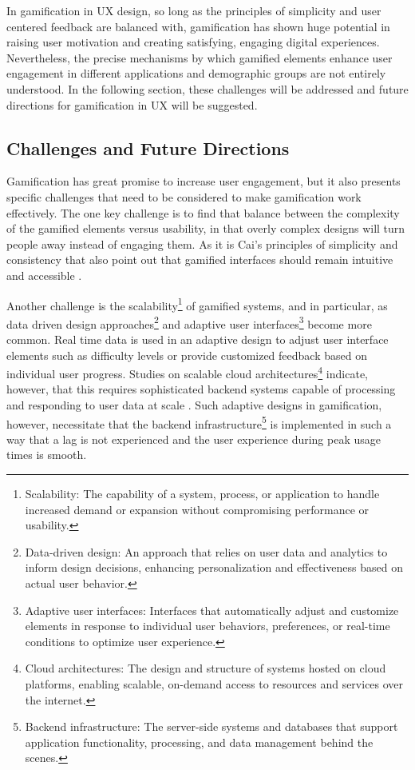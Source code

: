 \documentclass[conference]{IEEEtran}
\begin{document}
In gamification in UX design, so long as the principles of simplicity and user centered feedback are balanced with, gamification has shown huge potential in raising user motivation and creating satisfying, engaging digital experiences. Nevertheless, the precise mechanisms by which gamified elements enhance user engagement in different applications and demographic groups are not entirely understood. In the following section, these challenges will be addressed and future directions for gamification in UX will be suggested.

\subsection{Challenges and Future Directions}

Gamification has great promise to increase user engagement, but it also presents specific challenges that need to be considered to make gamification work effectively. The one key challenge is to find that balance between the complexity of the gamified elements versus usability, in that overly complex designs will turn people away instead of engaging them. As it is Cai’s principles of simplicity and consistency that also point out that gamified interfaces should remain intuitive and accessible \cite{cai2009}.

Another challenge is the scalability\footnote{Scalability: The capability of a system, process, or application to handle increased demand or expansion without compromising performance or usability.} of gamified systems, and in particular, as data driven design approaches\footnote{Data-driven design: An approach that relies on user data and analytics to inform design decisions, enhancing personalization and effectiveness based on actual user behavior.} and adaptive user interfaces\footnote{Adaptive user interfaces: Interfaces that automatically adjust and customize elements in response to individual user behaviors, preferences, or real-time conditions to optimize user experience.} become more common. Real time data is used in an adaptive design to adjust user interface elements such as difficulty levels or provide customized feedback based on individual user progress. Studies on scalable cloud architectures\footnote{Cloud architectures: The design and structure of systems hosted on cloud platforms, enabling scalable, on-demand access to resources and services over the internet.} indicate, however, that this requires sophisticated backend systems capable of processing and responding to user data at scale \cite{oracle2023}. Such adaptive designs in gamification, however, necessitate that the backend infrastructure\footnote{Backend infrastructure: The server-side systems and databases that support application functionality, processing, and data management behind the scenes.}
 is implemented in such a way that a lag is not experienced and the user experience during peak usage times \cite{linuxfoundation} is smooth.
\end{document}
